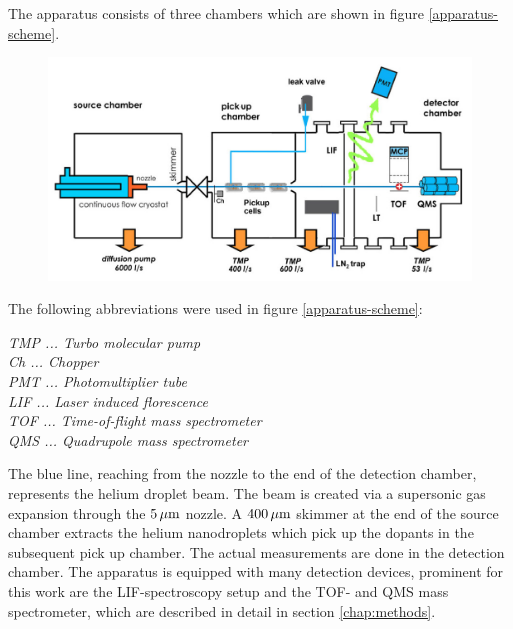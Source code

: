 \documentclass[parskip,12pt,headsepline,a4paper] {scrbook}
\begin{document}
The apparatus consists of three chambers which are shown in figure \ref{apparatus-scheme}.



\begin{figure}[ht]
\centerline{
\includegraphics[width=13cm]{./experimental_setup/scheme.jpg}}
\end{figure}

The following abbreviations were used in figure \ref{apparatus-scheme}:

\textit{TMP ... Turbo molecular pump} \\
\textit{Ch  ... Chopper} \\
\textit{PMT ... Photomultiplier tube} \\
\textit{LIF ... Laser induced florescence} \\
\textit{TOF ... Time-of-flight mass spectrometer} \\
\textit{QMS ... Quadrupole mass spectrometer}

The blue line, reaching from the nozzle to the end of the detection chamber, represents the helium droplet beam. The beam is created via a supersonic gas expansion through the $\unit[5]{\mu m}$ nozzle. A $\unit[400]{\mu m}$ skimmer at the end of the source chamber extracts the helium nanodroplets which pick up the dopants in the subsequent pick up chamber. The actual measurements are done in the detection chamber. The apparatus is equipped with many detection devices, prominent for this work are the LIF-spectroscopy setup and the TOF- and QMS mass spectrometer, which are described in detail in section \ref{chap:methods}.
\end{document}
